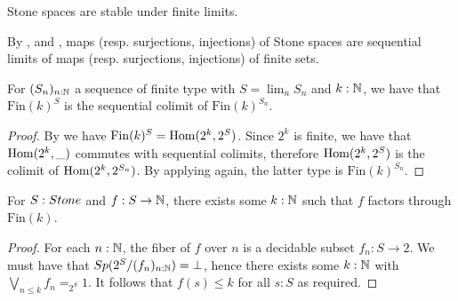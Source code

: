 \begin{corollary}
Stone spaces are stable under finite limits.
\end{corollary}
\begin{remark}\label{StoneClosedUnderPullback}\label{ProFiniteMapsFactorization}
  By , 
   and 
  , maps (resp. surjections, injections) of Stone spaces
  are sequential limits of maps (resp. surjections, injections) of finite sets. 
%
%
%
%
\end{remark}

\begin{lemma}\label{ScottFiniteCodomain}
  For $(S_n)_{n:\mathbb{N}}$ a sequence of finite type with $S=\lim_nS_n$ and $k:\mathbb{N}$, we have that $\mathrm{Fin}(k)^{S}$ is the sequential colimit of $\mathrm{Fin}(k)^{S_n}$.
\end{lemma}
\begin{proof}
  By  we have $\mathrm{Fin}(k)^S = \mathrm{Hom}(2^{k},2^S)$.
  Since $2^{k}$ is finite, we have that $\mathrm{Hom}(2^k,\_)$ commutes with sequential colimits, therefore $\mathrm{Hom}(2^{k},2^S)$ is the colimit of $\mathrm{Hom}(2^{k},2^{S_n})$. 
  By applying  again, %
  the latter type is $\mathrm{Fin}(k)^{S_n}$.%
\end{proof}

\begin{lemma}\label{MapsStoneToNareBounded}
  For $S:\Stone$ and $f:S \to \mathbb{N}$, there exists some $k:\mathbb{N}$ such that $f$ factors through $\mathrm{Fin}(k)$. 
\end{lemma}
\begin{proof}
  For each $n:\mathbb{N}$, the fiber of $f$ over $n$ is a decidable subset $f_n:S \to 2$. 
  We must have that $Sp(2^S/(f_n)_{n:\mathbb{N}}) = \bot$, hence there exists some $k:\mathbb{N}$ with 
  $\bigvee_{n\leq k} f_n =_{2^S} 1 $. 
  It follows that $f(s)\leq k$ for all $s:S$ as required. 
\end{proof}

